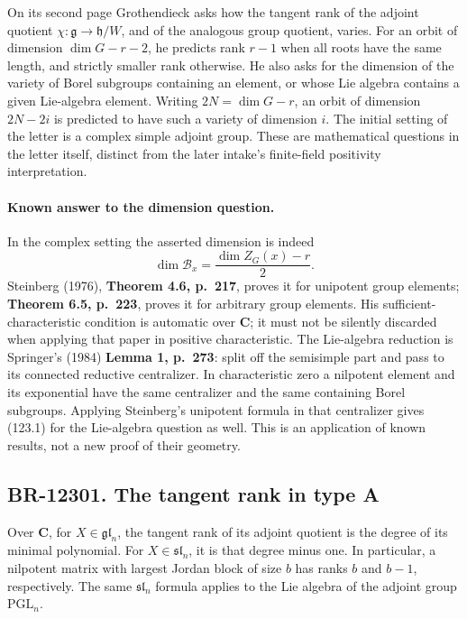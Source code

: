 \documentclass[11pt,a4paper]{article}
\theoremstyle{definition}\newtheorem{definition}[theorem]{Definition}
\theoremstyle{remark}\newtheorem{remark}[theorem]{Remark}
\begin{document}
On its second page Grothendieck asks how the tangent rank of the
adjoint quotient \(\chi:\mathfrak g\to\mathfrak h/W\), and of
the analogous group quotient, varies. For an orbit of dimension
\(\dim G-r-2\), he predicts rank \(r-1\) when all roots have
the same length, and strictly smaller rank otherwise. He also asks
for the dimension of the variety of Borel subgroups containing an
element, or whose Lie algebra contains a given Lie-algebra element.
Writing \(2N=\dim G-r\), an orbit of dimension \(2N-2i\)
is predicted to have such a variety of dimension \(i\).
The initial setting of the letter is a complex simple adjoint group.
These are mathematical questions in the letter itself, distinct
from the later intake's finite-field positivity interpretation.

\paragraph{Known answer to the dimension question.}
In the complex setting the asserted dimension is indeed
\[
 \dim\mathcal B_x=\frac{\dim Z_G(x)-r}{2}.
 \tag{123.1}
\]
Steinberg (1976), \textbf{Theorem 4.6, p.~217}, proves it for
unipotent group elements; \textbf{Theorem 6.5, p.~223}, proves
it for arbitrary group elements. His sufficient-characteristic
condition is automatic over \(\mathbf C\); it must not be
silently discarded when applying that paper in positive
characteristic. The Lie-algebra reduction is Springer's (1984)
\textbf{Lemma 1, p.~273}: split off the semisimple part and
pass to its connected reductive centralizer. In characteristic
zero a nilpotent element and its exponential have the same
centralizer and the same containing Borel subgroups. Applying
Steinberg's unipotent formula in that centralizer gives (123.1)
for the Lie-algebra question as well. This is an application
of known results, not a new proof of their geometry.

\subsection{BR-12301. The tangent rank in type A}
Over \(\mathbf C\), for \(X\in\mathfrak{gl}_n\), the tangent
rank of its adjoint quotient is the degree of its minimal
polynomial. For \(X\in\mathfrak{sl}_n\), it is that degree
minus one. In particular, a nilpotent matrix with largest
Jordan block of size \(b\) has ranks \(b\) and \(b-1\),
respectively. The same \(\mathfrak{sl}_n\) formula applies
to the Lie algebra of the adjoint group \(\mathrm{PGL}_n\).
\end{document}
